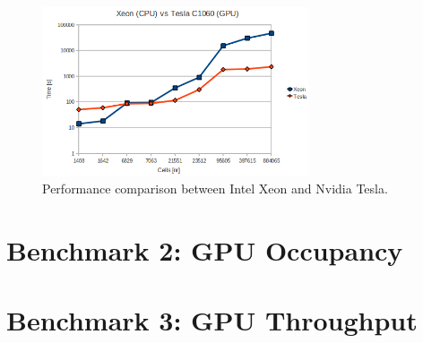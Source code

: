  
\begin{figure}[h!bt]
	\centerline{\includegraphics[width=0.7\textwidth]{img/XeonVsTesla.png}}
	\caption{Performance comparison between Intel Xeon and Nvidia Tesla.}
	\label{fig:NvidiaGPUsLogicalOrg}
\end{figure}

\section{Benchmark 2: GPU Occupancy}

\section{Benchmark 3: GPU Throughput}


